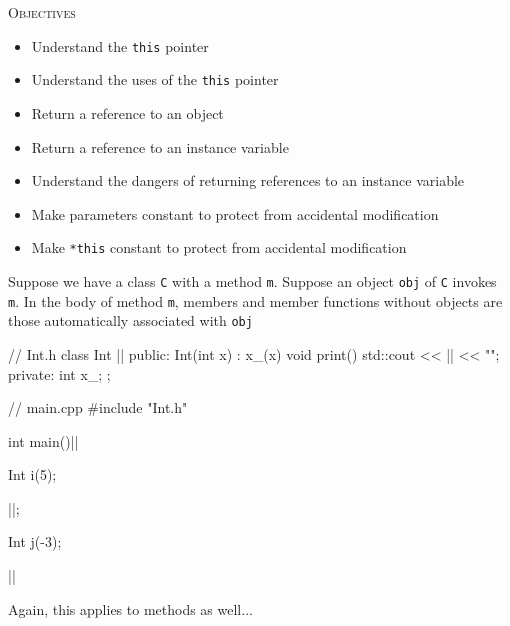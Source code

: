 \newpage{}

\textsc{Objectives}
\begin{itemize}
\item Understand the \texttt{this} pointer
\item Understand the uses of the \texttt{this} pointer
\item Return a reference to an object
\item Return a reference to an instance variable
\item Understand the dangers of returning references to an instance variable
\item Make parameters constant to protect from accidental modification
\item Make \texttt{*this} constant to protect from accidental modification
\end{itemize}


\newpage{}

Suppose we have a class \texttt{C} with a method \texttt{m}. Suppose an
object \texttt{obj} of \texttt{C} invokes \texttt{m}. In the body of method
\texttt{m}, members and member functions without objects are those
automatically associated with \texttt{obj}

\begin{consolethree}[escapeinside=||]
// Int.h
class Int ||
{
public:
    Int(int x) : x_(x) {}
    void print()
    {
        std::cout << || << "\n";
    }
private:
    int x_;
};
\end{consolethree}

\begin{consolethree}[escapeinside=||]
// main.cpp
#include "Int.h"

int main()||
{
    Int i(5);

    ||;

    Int j(-3);

    ||
}
\end{consolethree}

Again, this applies to methods as well...

